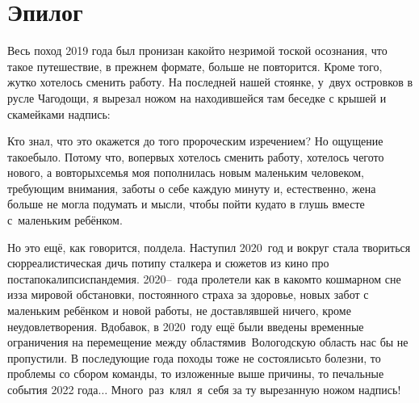 {
\cleardoublepage
{}

\fancyhead[LE]{\fancyplain{}{}}
\fancyhead[RO]{\fancyplain{}{}}

\section*{Эпилог}
Весь поход 2019 года был пронизан какой\sdash то незримой тоской осознания, что такое путешествие, в прежнем формате, больше не повторится. Кроме того, жутко хотелось сменить работу. На последней нашей стоянке, у~двух островков в русле Чагодощи, я вырезал ножом на находившейся там беседке с крышей и скамейками надпись:

{\centering\Large{}}

Кто знал, что это окажется до того пророческим изречением? Но ощущение такое\mdash было. Потому что, во\sdash первых хотелось сменить работу, хотелось чего\sdash то нового, а во\sdash вторых\mdash семья моя пополнилась новым маленьким человеком, требующим внимания, заботы о себе каждую минуту и, естественно, жена больше не могла подумать и мысли, чтобы пойти куда\sdash то в глушь вместе с~маленьким ребёнком.

Но это ещё, как говорится, полдела. Наступил 2020~год и вокруг стала твориться сюрреалистическая дичь потипу сталкера и сюжетов из кино про постапокалипсис\mdash пандемия. 2020\thinspace\nobreakdash--~года пролетели как в каком\sdash то кошмарном сне из\sdash за мировой обстановки, постоянного страха за здоровье, новых забот с маленьким ребёнком и новой работы, не доставлявшей ничего, кроме неудовлетворения. Вдобавок, в 2020~году ещё были введены временные ограничения на перемещение между областями\mdash в~Вологодскую область нас бы не пропустили. В последующие года походы тоже не состоялись\mdash то болезни, то проблемы со сбором команды, то изложенные выше причины, то печальные события 2022 года$\ldots$ Много~раз~клял~я~себя за ту вырезанную ножом надпись!

}
